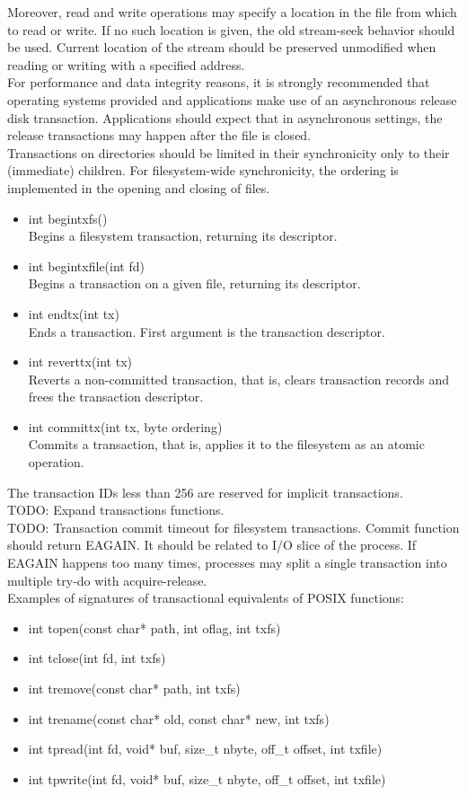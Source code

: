 Moreover, read and write operations may specify a location in the file from which to read or write. If no such location is given, the old stream-seek behavior should be used. Current location of the stream should be preserved unmodified when reading or writing with a specified address.\\
For performance and data integrity reasons, it is strongly recommended that operating systems provided and applications make use of an asynchronous release disk transaction. Applications should expect that in asynchronous settings, the release transactions may happen after the file is closed.\\
Transactions on directories should be limited in their synchronicity only to their (immediate) children. For filesystem-wide synchronicity, the ordering is implemented in the opening and closing of files.\\
\begin{itemize}
	\item int begintxfs()\\
	Begins a filesystem transaction, returning its descriptor.
	\item int begintxfile(int fd)\\
	Begins a transaction on a given file, returning its descriptor.
	\item int endtx(int tx)\\
	Ends a transaction. First argument is the transaction descriptor.
	\item int reverttx(int tx)\\
	Reverts a non-committed transaction, that is, clears transaction records and frees the transaction descriptor.
	\item int committx(int tx, byte ordering)\\
	Commits a transaction, that is, applies it to the filesystem as an atomic operation.
\end{itemize}
The transaction IDs less than 256 are reserved for implicit transactions.\\
TODO: Expand transactions functions.\\
TODO: Transaction commit timeout for filesystem transactions. Commit function should return EAGAIN. It should be related to I/O slice of the process. If EAGAIN happens too many times, processes may split a single transaction into multiple try-do with acquire-release.\\
Examples of signatures of transactional equivalents of POSIX functions:
\begin{itemize}
	\item int topen(const char* path, int oflag, int txfs)
	\item int tclose(int fd, int txfs)
	\item int tremove(const char* path, int txfs)
	\item int trename(const char* old, const char* new, int txfs)
	\item int tpread(int fd, void* buf, size\_t nbyte, off\_t offset, int txfile)
	\item int tpwrite(int fd, void* buf, size\_t nbyte, off\_t offset, int txfile)
\end{itemize}
